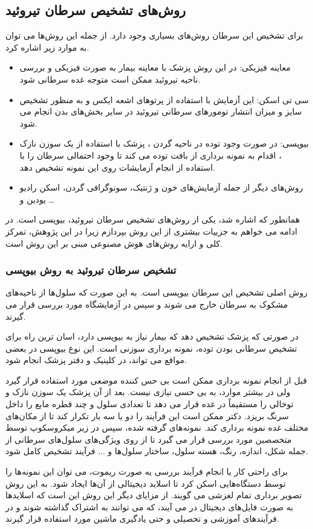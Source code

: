 \subsection{روش‌های تشخیص سرطان تیروئید}\label{subsec:روش-های-تشخیص-سرطان-تیروئید}

برای تشخیص این سرطان روش‌های بسیاری وجود دارد.
از جمله این روش‌ها می توان به موارد زیر اشاره کرد.

\begin{itemize}
    \item معاینه فیزیکی:
    در این روش پزشک با معاینه بیمار به صورت فیزیکی و بررسی ناحیه تیروئید ممکن است متوجه غده سرطانی شود.
    \item سی تی اسکن:
    این آزمایش با استفاده از پرتوهای اشعه ایکس و به منظور تشخیص سایز و میزان انتشار تومورهای سرطانی تیروئید در سایر بخش‌های بدن انجام می شود.
    \item بیوپسی:
    در صورت وجود توده در ناحیه گردن ، پزشک با استفاده از يک سوزن نازک ، اقدام به نمونه برداری از بافت توده می کند تا وجود احتمالی سرطان را با استفاده از انجام آزمایشات روی این نمونه تشخیص دهد.
    \item روش‌های دیگر از جمله آزمایش‌های خون و ژنتیک، سونوگرافی گردن، اسکن رادیو یودین و \ldots
\end{itemize}

همانطور که اشاره شد، یکی از روش‌های تشخیص سرطان تیروئید، بیوپسی است.
در ادامه می خواهم به جزییات بیشتری از این روش بپردازم زیرا در این پژوهش، تمرکز کلی و ارایه روش‌های هوش مصنوعی مبنی بر این روش است.

\subsubsection{تشخیص سرطان تیروئید به روش بیوپسی}
روش اصلی تشخیص این سرطان بیوپسی است.
به این صورت که سلول‌ها از ناحیه‌های مشکوک به سرطان خارج می شوند و سپس در آزمایشگاه مورد بررسی قرار می گیرند.

در صورتی که پزشک تشخیص دهد که بیمار نیاز به بیوپسی دارد، اسان ترین راه برای تشخیص سرطانی بودن توده،
نمونه برداری سوزنی است.
این نوع بیوپسی در بعضی مواقع می تواند، در کلینیک و دفتر پزشک انجام شود.

قبل از انجام نمونه برداری ممکن است بی حس کننده موضعی مورد استفاده قرار گیرد ولی در بیشتر موارد، به بی حسی نیازی نیست.
بعد از آن پزشک یک سوزن نازک و توخالی را مستقیماً در غده قرار می دهد تا تعدادی سلول و چند قطره مایع را داخل سرنگ بریزد.
دکتر ممکن است این فرآیند را دو یا سه بار تکرار کند تا از مکان‌های مختلف غده نمونه برداری کند.
نمونه‌های گرفته شده، سپس در زیر میکروسکوپ توسط متخصصین مورد بررسی قرار می گیرد تا از روی ویژگی‌های سلول‌های سرطانی از جمله شکل، اندازه، رنگ، هسته سلول، ساختار سلول‌ها و ... فرآیند تشخیص کامل شود.

برای راحتی کار یا انجام فرآیند بررسی یه صورت ریموت، می توان این نمونه‌ها را توسط دستگاه‌هایی اسکن کرد تا اسلاید دیجیتالی از آن‌ها ایجاد شود.
به این روش تصویر برداری تمام لغزشی می گویند.
از مزایای دیگر این روش این است که اسلاید‌ها به صورت فایل‌های دیجیتال در می آیند، که می توانند به اشتراک گذاشته شوند و در فرآیند‌های آموزشی و تحصیلی و حتی یادگیری ماشین مورد استفاده قرار گیرند.


\newpage

